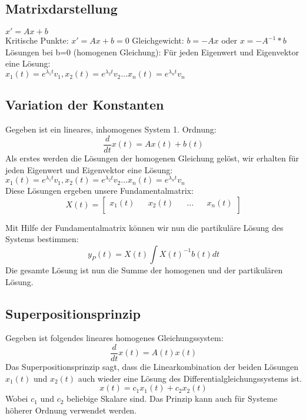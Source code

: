 \subsection{Matrixdarstellung}
$x' = Ax + b$\\
Kritische Punkte: $x' = Ax + b = 0$ Gleichgewicht: $b = -Ax$ oder $x = -A^{-1}*b$\\
Lösungen bei b=0 (homogenen Gleichung): Für jeden Eigenwert und Eigenvektor eine Lösung: \\
$x_1(t) = e^{\lambda_1t}v_1,x_2(t) = e^{\lambda_2t}v_2...x_n(t) = e^{\lambda_nt}v_n$\\

\subsection{Variation der Konstanten}
Gegeben ist ein lineares, inhomogenes System 1. Ordnung: \\
\begin{equation*}
\frac{d}{dt}x(t) = Ax(t) + b(t) 
\end{equation*}
Als erstes werden die Lösungen der homogenen Gleichung gelöst, wir erhalten für jeden Eigenwert und Eigenvektor eine Lösung: \\
$x_1(t) = e^{\lambda_1t}v_1,x_2(t) = e^{\lambda_2t}v_2...x_n(t) = e^{\lambda_nt}v_n$\\
Diese Lösungen ergeben unsere Fundamentalmatrix:\\
\begin{equation*}
X(t) = 
	\begin{bmatrix} 
	        x_1(t) && x_2(t) && ... && x_n(t)\\    
	\end{bmatrix}
\end{equation*}

Mit Hilfe der Fundamentalmatrix können wir nun die partikuläre Lösung des Systems bestimmen:\\
\begin{equation*}
y_P(t) = X(t) \int{X(t)^{-1}b(t)dt}
\end{equation*}
Die gesamte Lösung ist nun die Summe der homogenen und der partikulären Lösung.

\newpage
\subsection{Superpositionsprinzip}
Gegeben ist folgendes lineares homogenes Gleichungssystem:
\begin{equation*}
\frac{d}{dt}x(t) = A(t)x(t)
\end{equation*}
Das Superpositionsprinzip sagt, dass die Linearkombination der beiden Lösungen $x_1(t)$ und $x_2(t)$ auch wieder eine Lösung des Differentialgleichungssystems ist. 
\begin{equation*}
	x(t) = c_1 x_1(t) + c_2 x_2(t)
\end{equation*}
Wobei $c_1$ und $c_2$ beliebige Skalare sind. 
Das Prinzip kann auch für Systeme höherer Ordnung verwendet werden. \\

